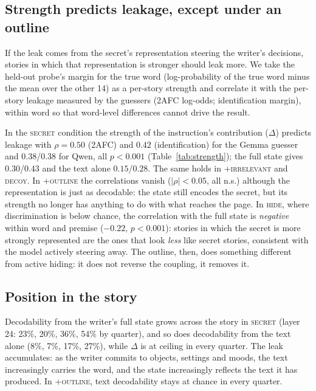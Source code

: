 \documentclass[11pt]{article}
\begin{document}
\subsection{Strength predicts leakage, except under an outline}
\label{sec:strength}
If the leak comes from the secret's representation steering the writer's decisions, stories in which that representation is stronger should leak more. We take the held-out probe's margin for the true word (log-probability of the true word minus the mean over the other 14) as a per-story strength and correlate it with the per-story leakage measured by the guessers (2AFC log-odds; identification margin), within word so that word-level differences cannot drive the result.

\begin{table}[t]
\centering\small
\caption{Within-word Spearman correlation between per-story representation strength (held-out probe margin, layer 24) and per-story leakage (2AFC log-odds; 15-way identification margin). $n=360$ per condition.}
\label{tab:strength}
\end{table}

In the \textsc{secret} condition the strength of the instruction's contribution ($\Delta$) predicts leakage with $\rho=0.50$ (2AFC) and $0.42$ (identification) for the Gemma guesser and $0.38$/$0.38$ for Qwen, all $p<0.001$ (Table~\ref{tab:strength}); the full state gives $0.30$/$0.43$ and the text alone $0.15$/$0.28$. The same holds in \textsc{+irrelevant} and \textsc{decoy}. In \textsc{+outline} the correlations vanish ($|\rho|<0.05$, all n.s.) although the representation is just as decodable: the state still encodes the secret, but its strength no longer has anything to do with what reaches the page. In \textsc{hide}, where discrimination is below chance, the correlation with the full state is \emph{negative} within word and premise ($-0.22$, $p<0.001$): stories in which the secret is more strongly represented are the ones that look \emph{less} like secret stories, consistent with the model actively steering away. The outline, then, does something different from active hiding: it does not reverse the coupling, it removes it.

\subsection{Position in the story}
\label{sec:position}
Decodability from the writer's full state grows across the story in \textsc{secret} (layer 24: 23\%, 20\%, 36\%, 54\% by quarter), and so does decodability from the text alone (8\%, 7\%, 17\%, 27\%), while $\Delta$ is at ceiling in every quarter. The leak accumulates: as the writer commits to objects, settings and moods, the text increasingly carries the word, and the state increasingly reflects the text it has produced. In \textsc{+outline}, text decodability stays at chance in every quarter.
\end{document}
